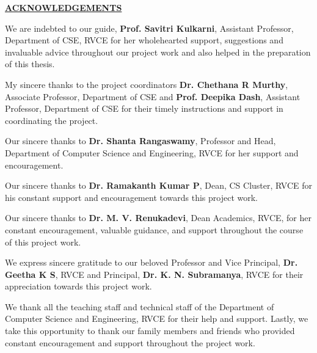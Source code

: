 \thispagestyle{empty}
\begin{center}
	\Large\textbf{\underline{ACKNOWLEDGEMENTS}} \par
\end{center}

\vspace{0.5cm}

We are indebted to our guide, \textbf{Prof. Savitri Kulkarni}, Assistant Professor, Department of CSE, RVCE for her wholehearted support, suggestions and invaluable advice throughout our project work and also helped in the preparation of this thesis.\\ \par

My sincere thanks to the project coordinators \textbf{Dr. Chethana R Murthy}, Associate Professor, Department of CSE and \textbf{Prof. Deepika Dash}, Assistant Professor, Department of CSE for their timely instructions and support in coordinating the project.\\ \par

Our sincere thanks to \textbf{Dr. Shanta Rangaswamy}, Professor and Head, Department of Computer Science and Engineering, RVCE for her support and encouragement.\\ \par

Our sincere thanks to \textbf{Dr. Ramakanth Kumar P}, Dean, CS Cluster, RVCE for his constant support and encouragement towards this project work.\\ \par

Our sincere thanks to \textbf{Dr. M. V. Renukadevi}, Dean Academics, RVCE, for her constant encouragement, valuable guidance, and support throughout the course of this project work.\\ \par

We express sincere gratitude to our beloved Professor and Vice Principal, \textbf{Dr. Geetha K S}, RVCE and Principal, \textbf{Dr. K. N. Subramanya}, RVCE for their appreciation towards this project work.\\ \par

We thank all the teaching staff and technical staff of the Department of Computer Science and Engineering, RVCE for their help and support. Lastly, we take this opportunity to thank our family members and friends who provided constant encouragement and support throughout the project work.\\ \par
